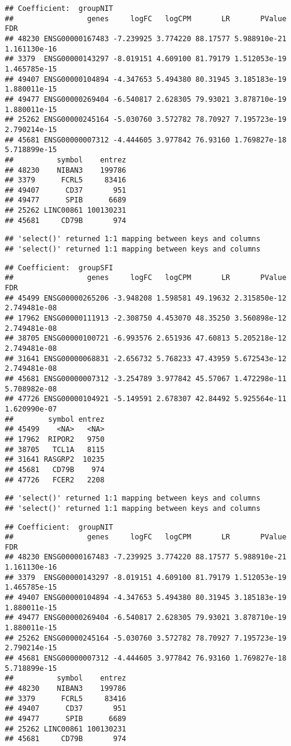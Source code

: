 \documentclass[
]{article}
\begin{document}
\begin{verbatim}
## Coefficient:  groupNIT 
##                 genes     logFC   logCPM       LR       PValue          FDR
## 48230 ENSG00000167483 -7.239925 3.774220 88.17577 5.988910e-21 1.161130e-16
## 3379  ENSG00000143297 -8.019151 4.609100 81.79179 1.512053e-19 1.465785e-15
## 49407 ENSG00000104894 -4.347653 5.494380 80.31945 3.185183e-19 1.880011e-15
## 49477 ENSG00000269404 -6.540817 2.628305 79.93021 3.878710e-19 1.880011e-15
## 25262 ENSG00000245164 -5.030760 3.572782 78.70927 7.195723e-19 2.790214e-15
## 45681 ENSG00000007312 -4.444605 3.977842 76.93160 1.769827e-18 5.718899e-15
##          symbol    entrez
## 48230    NIBAN3    199786
## 3379      FCRL5     83416
## 49407      CD37       951
## 49477      SPIB      6689
## 25262 LINC00861 100130231
## 45681     CD79B       974
\end{verbatim}

\begin{verbatim}
## 'select()' returned 1:1 mapping between keys and columns
## 'select()' returned 1:1 mapping between keys and columns
\end{verbatim}

\begin{verbatim}
## Coefficient:  groupSFI 
##                 genes     logFC   logCPM       LR       PValue          FDR
## 45499 ENSG00000265206 -3.948208 1.598581 49.19632 2.315850e-12 2.749481e-08
## 17962 ENSG00000111913 -2.308750 4.453070 48.35250 3.560898e-12 2.749481e-08
## 38705 ENSG00000100721 -6.993576 2.651936 47.60813 5.205218e-12 2.749481e-08
## 31641 ENSG00000068831 -2.656732 5.768233 47.43959 5.672543e-12 2.749481e-08
## 45681 ENSG00000007312 -3.254789 3.977842 45.57067 1.472298e-11 5.708982e-08
## 47726 ENSG00000104921 -5.149591 2.678307 42.84492 5.925564e-11 1.620990e-07
##        symbol entrez
## 45499    <NA>   <NA>
## 17962  RIPOR2   9750
## 38705   TCL1A   8115
## 31641 RASGRP2  10235
## 45681   CD79B    974
## 47726   FCER2   2208
\end{verbatim}

\begin{verbatim}
## 'select()' returned 1:1 mapping between keys and columns
## 'select()' returned 1:1 mapping between keys and columns
\end{verbatim}

\begin{verbatim}
## Coefficient:  groupNIT 
##                 genes     logFC   logCPM       LR       PValue          FDR
## 48230 ENSG00000167483 -7.239925 3.774220 88.17577 5.988910e-21 1.161130e-16
## 3379  ENSG00000143297 -8.019151 4.609100 81.79179 1.512053e-19 1.465785e-15
## 49407 ENSG00000104894 -4.347653 5.494380 80.31945 3.185183e-19 1.880011e-15
## 49477 ENSG00000269404 -6.540817 2.628305 79.93021 3.878710e-19 1.880011e-15
## 25262 ENSG00000245164 -5.030760 3.572782 78.70927 7.195723e-19 2.790214e-15
## 45681 ENSG00000007312 -4.444605 3.977842 76.93160 1.769827e-18 5.718899e-15
##          symbol    entrez
## 48230    NIBAN3    199786
## 3379      FCRL5     83416
## 49407      CD37       951
## 49477      SPIB      6689
## 25262 LINC00861 100130231
## 45681     CD79B       974
\end{verbatim}
\end{document}
